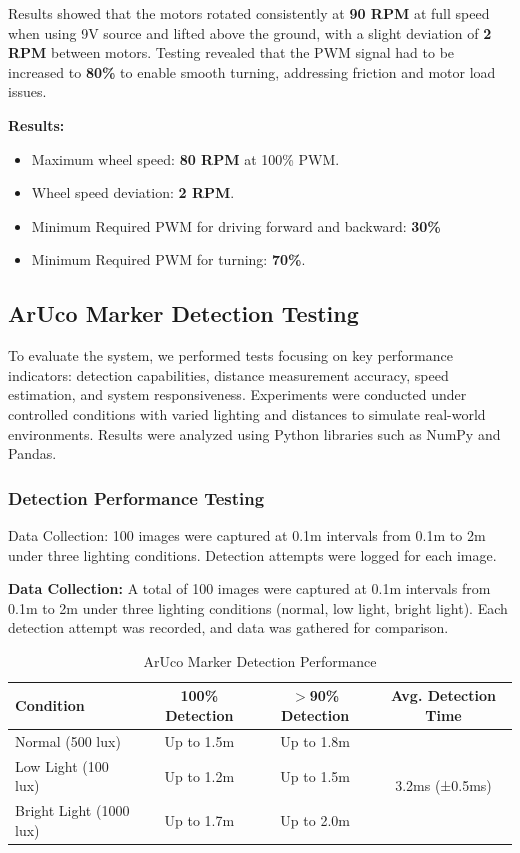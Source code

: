 Results showed that the motors rotated consistently at \textbf{90 RPM} at full speed when using 9V source and lifted above the ground, with a slight deviation of \textbf{2 RPM} between motors. Testing revealed that the PWM signal had to be increased to \textbf{80\%} to enable smooth turning, addressing friction and motor load issues.

\textbf{Results:}
\begin{itemize}
	\item Maximum wheel speed: \textbf{80 RPM} at 100\% PWM.
	\item Wheel speed deviation: \textbf{2 RPM}.
	\item Minimum Required PWM for driving forward and backward: \textbf{30\%}
	\item Minimum Required PWM for turning: \textbf{70\%}.
\end{itemize}


\subsection{ArUco Marker Detection Testing}
To evaluate the system, we performed tests focusing on key performance indicators: detection capabilities, distance measurement accuracy, speed estimation, and system responsiveness. Experiments were conducted under controlled conditions with varied lighting and distances to simulate real-world environments. Results were analyzed using Python libraries such as NumPy and Pandas.

\subsubsection{Detection Performance Testing}
Data Collection: 100 images were captured at 0.1m intervals from 0.1m to 2m under three lighting conditions. Detection attempts were logged for each image.

\textbf{Data Collection:} 
A total of 100 images were captured at 0.1m intervals from 0.1m to 2m under three lighting conditions (normal, low light, bright light). Each detection attempt was recorded, and data was gathered for comparison.

\begin{table}[H]
	\centering
	\caption{ArUco Marker Detection Performance}
	\label{tab:aruco_detection}
	\begin{tabular}{lccc}
		\hline
		\textbf{Condition} & \textbf{100\% Detection} & \textbf{$>$90\% Detection} & \textbf{Avg. Detection Time} \\
		\hline
		Normal (500 lux) & Up to 1.5m & Up to 1.8m & \multirow{3}{*}{3.2ms (±0.5ms)} \\
		Low Light (100 lux) & Up to 1.2m & Up to 1.5m & \\
		Bright Light (1000 lux) & Up to 1.7m & Up to 2.0m & \\
		\hline
	\end{tabular}
\end{table}


